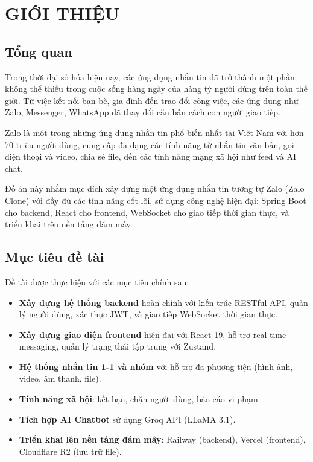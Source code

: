 \documentclass[12pt,a4paper]{report}
\begin{document}
\setcounter{page}{1}

\chapter{GIỚI THIỆU}

\section{Tổng quan}

Trong thời đại số hóa hiện nay, các ứng dụng nhắn tin đã trở thành một phần không thể thiếu trong cuộc sống hàng ngày của hàng tỷ người dùng trên toàn thế giới. Từ việc kết nối bạn bè, gia đình đến trao đổi công việc, các ứng dụng như Zalo, Messenger, WhatsApp đã thay đổi căn bản cách con người giao tiếp.

Zalo là một trong những ứng dụng nhắn tin phổ biến nhất tại Việt Nam với hơn 70 triệu người dùng, cung cấp đa dạng các tính năng từ nhắn tin văn bản, gọi điện thoại và video, chia sẻ file, đến các tính năng mạng xã hội như feed và AI chat.

Đồ án này nhằm mục đích xây dựng một ứng dụng nhắn tin tương tự Zalo (Zalo Clone) với đầy đủ các tính năng cốt lõi, sử dụng công nghệ hiện đại: Spring Boot cho backend, React cho frontend, WebSocket cho giao tiếp thời gian thực, và triển khai trên nền tảng đám mây.

\section{Mục tiêu đề tài}

Đề tài được thực hiện với các mục tiêu chính sau:

\begin{itemize}
    \item \textbf{Xây dựng hệ thống backend} hoàn chỉnh với kiến trúc RESTful API, quản lý người dùng, xác thực JWT, và giao tiếp WebSocket thời gian thực.
    \item \textbf{Xây dựng giao diện frontend} hiện đại với React 19, hỗ trợ real-time messaging, quản lý trạng thái tập trung với Zustand.
    \item \textbf{Hệ thống nhắn tin 1-1 và nhóm} với hỗ trợ đa phương tiện (hình ảnh, video, âm thanh, file).
    \item \textbf{Tính năng xã hội}: kết bạn, chặn người dùng, báo cáo vi phạm.
    \item \textbf{Tích hợp AI Chatbot} sử dụng Groq API (LLaMA 3.1).
    \item \textbf{Triển khai lên nền tảng đám mây}: Railway (backend), Vercel (frontend), Cloudflare R2 (lưu trữ file).
\end{itemize}
\end{document}
